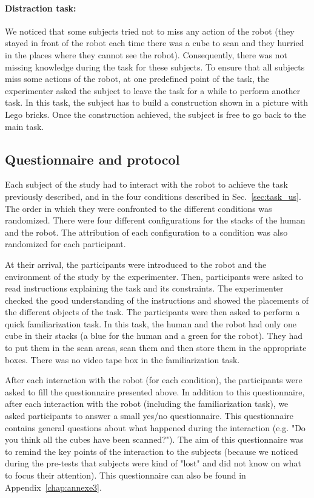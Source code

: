 \documentclass[english,a4paper,11pt,twoside]{StyleThese}
\begin{document}
\paragraph{Distraction task:}
We noticed that some subjects tried not to miss any action of the robot (they stayed in front of the robot each time there was a cube to scan and they hurried in the places where they cannot see the robot). Consequently, there was not missing knowledge during the task for these subjects. To ensure that all subjects miss some actions of the robot, at one predefined point of the task, the experimenter asked the subject to leave the task for a while to perform another task. In this task, the subject has to build a construction shown in a picture with Lego bricks. Once the construction achieved, the subject is free to go back to the main task.


\subsection{Questionnaire and protocol}

Each subject of the study had to interact with the robot to achieve the task previously described, and in the four conditions described in Sec.~\ref{sec:task_us}. The order in which they were confronted to the different conditions was randomized. There were four different configurations for the stacks of the human and the robot. The attribution of each configuration to a condition was also randomized for each participant.

At their arrival, the participants were introduced to the robot and the environment of the study by the experimenter. Then, participants were asked to read instructions explaining the task and its constraints. The experimenter checked the good understanding of the instructions and showed the placements of the different objects of the task. The participants were then asked to perform a quick familiarization task. In this task, the human and the robot had only one cube in their stacks (a blue for the human and a green for the robot). They had to put them in the scan areas, scan them and then store them in the appropriate boxes. There was no video tape box in the familiarization task. 

After each interaction with the robot (for each condition), the participants were asked to fill the questionnaire presented above. In addition to this questionnaire, after each interaction with the robot (including the familiarization task), we asked participants to answer a small yes/no questionnaire. This questionnaire contains general questions about what happened during the interaction (e.g. "Do you think all the cubes have been scanned?"). The aim of this questionnaire was to remind the key points of the interaction to the subjects (because we noticed during the pre-tests that subjects were kind of "lost" and did not know on what to focus their attention). This questionnaire can also be found in Appendix~\ref{chap:annexe3}.
\end{document}
